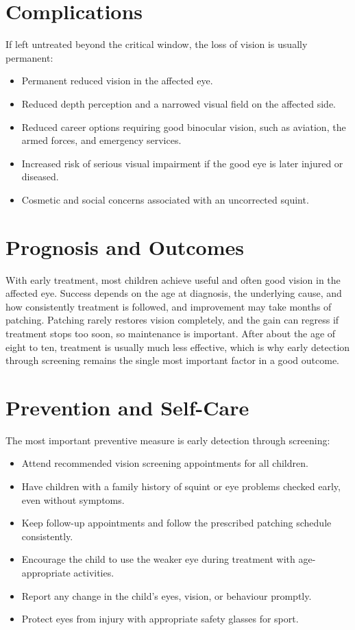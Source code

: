 \section*{Complications}
If left untreated beyond the critical window, the loss of vision is usually permanent:

\begin{itemize}
    \item Permanent reduced vision in the affected eye.
    \item Reduced depth perception and a narrowed visual field on the affected side.
    \item Reduced career options requiring good binocular vision, such as aviation, the armed forces, and emergency services.
    \item Increased risk of serious visual impairment if the good eye is later injured or diseased.
    \item Cosmetic and social concerns associated with an uncorrected squint.
\end{itemize}

\section*{Prognosis and Outcomes}
With early treatment, most children achieve useful and often good vision in the affected eye. Success depends on the age at diagnosis, the underlying cause, and how consistently treatment is followed, and improvement may take months of patching. Patching rarely restores vision completely, and the gain can regress if treatment stops too soon, so maintenance is important. After about the age of eight to ten, treatment is usually much less effective, which is why early detection through screening remains the single most important factor in a good outcome.

\section*{Prevention and Self-Care}
The most important preventive measure is early detection through screening:

\begin{itemize}
    \item Attend recommended vision screening appointments for all children.
    \item Have children with a family history of squint or eye problems checked early, even without symptoms.
    \item Keep follow-up appointments and follow the prescribed patching schedule consistently.
    \item Encourage the child to use the weaker eye during treatment with age-appropriate activities.
    \item Report any change in the child's eyes, vision, or behaviour promptly.
    \item Protect eyes from injury with appropriate safety glasses for sport.
\end{itemize}

